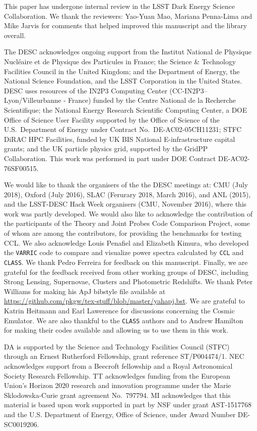 %
This paper has undergone internal review in the LSST Dark Energy Science Collaboration. We thank the reviewers: Yao-Yuan Mao, Mariana Penna-Lima and Mike Jarvis for comments that helped improved this manuscript and the \ccl library overall. 

The DESC acknowledges ongoing support from the Institut National de Physique Nucl\'eaire et de Physique des Particules in France; the Science \& Technology Facilities Council in the United Kingdom; and the Department of Energy, the National Science Foundation, and the LSST Corporation in the United States.  DESC uses resources of the IN2P3 Computing Center (CC-IN2P3--Lyon/Villeurbanne - France) funded by the Centre National de la Recherche Scientifique; the National Energy Research Scientific Computing Center, a DOE Office of Science User Facility supported by the Office of Science of the U.S.\ Department of Energy under Contract No.\ DE-AC02-05CH11231; STFC DiRAC HPC Facilities, funded by UK BIS National E-infrastructure capital grants; and the UK particle physics grid, supported by the GridPP Collaboration. This work was performed in part under DOE Contract DE-AC02-76SF00515. 

We would like to thank the organisers of the the DESC meetings at: CMU (July 2018), Oxford (July 2016), SLAC (Ferurary 2018, March 2016), and ANL (2015), and the LSST-DESC Hack Week organisers (CMU, November 2016), where this work was partly developed. We would also like to acknowledge the contribution of the participants of the Theory and Joint Probes Code Comparison Project, some of whom are among the \ccl contributors, for providing the benchmarks for testing CCL. We also acknowledge Louis Penafiel and Elizabeth Kimura, who developed the {\tt VARRIC} code to compare and visualize power spectra calculated by {\tt CCL} and {\tt CLASS}. We thank Pedro Ferreira for feedback on this manuscript. Finally, we are grateful for the feedback received from other working groups of DESC, including Strong Lensing, Supernovae, Clusters and Photometric Redshifts.
We thank Peter Williams for making his ApJ bibstyle file available at \url{https://github.com/pkgw/tex-stuff/blob/master/yahapj.bst}. We are grateful to Katrin Heitmann and Earl Lawerence for discussions concerning the Cosmic Emulator. We are also thankful to the {\tt CLASS} authors and to Andrew Hamilton for making their codes available and allowing us to use them in this work. 
%

DA is supported by the Science and Technology Facilities Council (STFC) through an Ernest Rutherford Fellowship, grant reference ST/P004474/1. NEC acknowledges support from a Beecroft fellowship and a Royal Astronomical Society Research Fellowship. TT acknowledges funding from the European Union's Horizon 2020 research and innovation programme under the Marie Sk{l}odowska-Curie grant agreement No.\ 797794. MI acknowledges that this material is based upon work supported in part by NSF under grant AST-1517768 and the U.S. Department of Energy, Office of Science, under Award Number DE-SC0019206.

